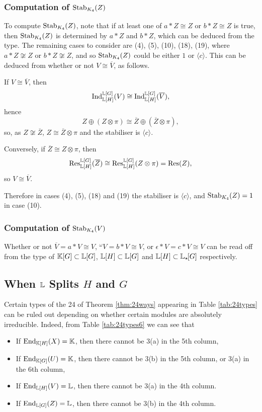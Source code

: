 \subsubsection{Computation of $\operatorname{Stab}_{K_4}(Z)$}

To compute $\operatorname{Stab}_{K_4}(Z)$, note that if at least one of $a * Z \cong Z$ or $b * Z \cong Z$ is true, then $\operatorname{Stab}_{K_4}(Z)$ is determined by $a * Z$ and $b * Z$, which can be deduced from the type. The remaining cases to consider are (4), (5), (10), (18), (19), where $a * Z \not\cong Z$ or $b * Z \not\cong Z$, and so $\operatorname{Stab}_{K_4}(Z)$ could be either $1$ or $\langle c \rangle$. This can be deduced from whether or not $V \cong \overline{V}$, as follows.

If $V \cong \overline{V}$, then
\[
\operatorname{Ind}_{{\mathbb L}[H]}^{{\mathbb L}[G]}(V) \cong \operatorname{Ind}_{{\mathbb L}[H]}^{{\mathbb L}[G]}(\overline{V}),
\]
hence
\[
Z \oplus (Z \otimes \pi) \cong \overline{Z} \oplus (\overline{Z} \otimes \pi),
\]
so, as $Z \not\cong \overline{Z}$, $Z \cong \overline{Z} \otimes \pi$ and the stabiliser is $\langle c \rangle$.

Conversely, if $\overline{Z} \cong Z \otimes \pi$, then
\[
\Res_{\bL[H]}^{\bL[G]}(\overline{Z}) \cong \Res_{\bL[H]}^{\bL[G]}(Z \otimes \pi) = \Res(Z),
\]
so $V \cong \overline{V}$. 

Therefore in cases (4), (5), (18) and (19) the stabiliser is $\langle c \rangle$, and $\operatorname{Stab}_{K_4}(Z) = 1$ in case (10).

\subsubsection{Computation of $\operatorname{Stab}_{K_4}(V)$}

Whether or not $\overline{V} = a * V \cong V$, ${}^{\omega} V = b * V \cong V$, or $\epsilon * V = c * V \cong V$ can be read off from the type of ${\mathbb K}[G] \subset {\mathbb L}[G]$, ${\mathbb L}[H] \subset {\mathbb L}[G]$ and ${\mathbb L}[H] \subset {\mathbb L}_{\star \hspace{-0.1em}}[G]$ respectively.

\subsection{When ${\mathbb L}$ Splits $H$ and $G$}\label{sect:LsplitsHG}

Certain types of the 24 of Theorem \ref{thm:24ways} appearing in Table \ref{tab:24types} can be ruled out depending on whether certain modules are absolutely irreducible. Indeed, from Table \ref{tab:24types6} we can see that
\begin{itemize}
    \item If $\operatorname{End}_{{\mathbb K}[H]}(X) = {\mathbb K}$, then there cannot be 3(a) in the 5th column,
    \item If $\operatorname{End}_{{\mathbb K}[G]}(U) = {\mathbb K}$, then there cannot be 3(b) in the 5th column, or 3(a) in the 6th column,
    \item If $\operatorname{End}_{{\mathbb L}[H]}(V) = {\mathbb L}$, then there cannot be 3(a) in the 4th column.
    \item If $\operatorname{End}_{{\mathbb L}[G]}(Z) = {\mathbb L}$, then there cannot be 3(b) in the 4th column.
\end{itemize}

